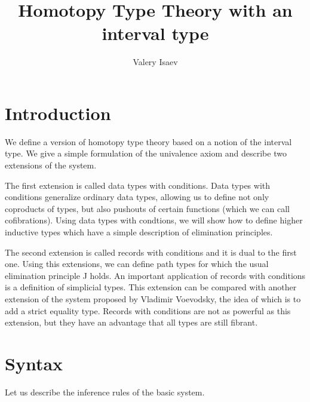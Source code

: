 \documentclass{amsart}
\theoremstyle{definition}
\theoremstyle{remark}
\numberwithin{figure}{section}
\begin{document}
\title{Homotopy Type Theory with an interval type}

\author{Valery Isaev}


\maketitle

\section{Introduction}

We define a version of homotopy type theory based on a notion of the interval type.
We give a simple formulation of the univalence axiom and describe two extensions of the system.

The first extension is called data types with conditions.
Data types with conditions generalize ordinary data types, allowing us to define not only coproducts of types, but also pushouts of certain functions (which we can call cofibrations).
Using data types with condtions, we will show how to define higher inductive types which have a simple description of elimination principles.

The second extension is called records with conditions and it is dual to the first one.
Using this extensions, we can define path types for which the usual elimination principle J holds.
An important application of records with conditions is a definition of simplicial types.
This extension can be compared with another extension of the system proposed by Vladimir Voevodsky, the idea of which is to add a strict equality type.
Records with conditions are not as powerful as this extension, but they have an advantage that all types are still fibrant.

\section{Syntax}

Let us describe the inference rules of the basic system.

\centerAlignProof
\end{document}
